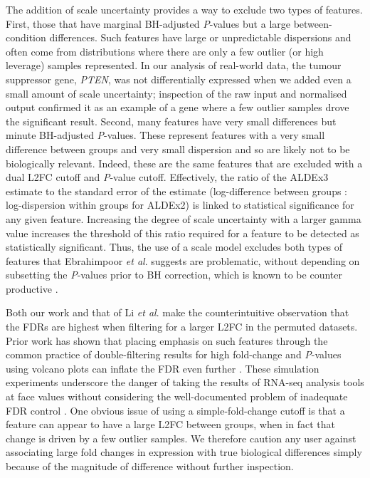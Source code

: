 \documentclass[10pt,letterpaper]{article}
\begin{document}
The addition of scale uncertainty provides a way to exclude two types of features. First, those that have marginal BH-adjusted \textit{P}-values but a large between-condition differences. Such features have large or unpredictable dispersions and often come from distributions where there are only a few outlier (or high leverage) samples represented. In our analysis of real-world data, the tumour suppressor gene, \textit{PTEN}, was not differentially expressed when we added even a small amount of scale uncertainty; inspection of the raw input and normalised output confirmed it as an example of a gene where a few outlier samples drove the significant result. Second, many features have very small differences but minute BH-adjusted \textit{P}-values. These represent features with a very small difference between groups and very small dispersion and so are likely not to be biologically relevant. Indeed, these are the same features that are excluded with a dual L2FC cutoff and \textit{P}-value cutoff. Effectively, the ratio of the ALDEx3 estimate to the standard error of the estimate (log-difference between groups : log-dispersion within groups for ALDEx2) is linked to statistical significance for any given feature. Increasing the degree of scale uncertainty with a larger gamma value increases the threshold of this ratio required for a feature to be detected as statistically significant. Thus, the use of a scale model excludes both types of features that Ebrahimpoor \textit{et al}. \cite{ebrahimpoor_inflated_2021} suggests are problematic, without depending on subsetting the \textit{P}-values prior to BH correction, which is known to be counter productive \cite{Goeman:2014aa, ebrahimpoor_inflated_2021}.

Both our work and that of Li \textit{et al}. make the counterintuitive observation that the FDRs are highest when filtering for a larger L2FC in the permuted datasets. Prior work has shown that placing emphasis on such features through the common practice of double-filtering results for high fold-change and \textit{P}-values using volcano plots can inflate the FDR even further \cite{Cui:2003aa, bourgon_independent_2010}. These simulation experiments underscore the danger of taking the results of RNA-seq analysis tools at face values without considering the well-documented problem of inadequate FDR control \cite{witten2007comparison, Zhang:2009aa}. One obvious issue of using a simple-fold-change cutoff is that a feature can appear to have a large L2FC between groups, when in fact that change is driven by a few outlier samples. We therefore caution any user against associating large fold changes in expression with true biological differences simply because of the magnitude of difference without further inspection.
\end{document}
